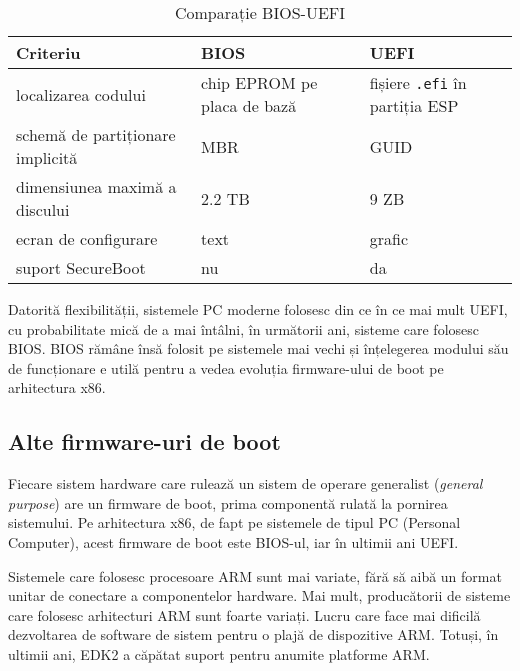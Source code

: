 \begin{table}[!htb]
  \caption{Comparație BIOS-UEFI}
  \begin{center}
    \begin{tabular}{ p{} p{} p{} }
      \toprule
        \textbf{Criteriu} &
        \textbf{BIOS} &
        \textbf{UEFI} \\
      \midrule
        localizarea codului &
        chip EPROM pe placa de bază &
        fișiere \texttt{.efi} în partiția ESP \\

        schemă de partiționare implicită &
        MBR &
        GUID \\

        dimensiunea maximă a discului &
        2.2 TB &
        9 ZB \\

        ecran de configurare &
        text &
        grafic \\

        suport SecureBoot &
        nu &
        da \\

      \bottomrule
    \end{tabular}
    \label{tab:boot:bios-uefi}
  \end{center}
\end{table}

Datorită flexibilității, sistemele PC  moderne
folosesc din ce în ce mai mult UEFI, cu probabilitate mică de a mai întâlni, în următorii ani,
sisteme care folosesc BIOS. BIOS rămâne însă folosit pe
sistemele mai vechi și înțelegerea modului său de funcționare e utilă pentru a
vedea evoluția firmware-ului de boot pe arhitectura x86.

\subsection{Alte firmware-uri de boot}
\label{sec:boot:other}

Fiecare sistem hardware care rulează un sistem de operare generalist (\textit{general
purpose}) are un firmware de boot, prima componentă rulată la pornirea
sistemului. Pe arhitectura x86, de fapt pe sistemele de tipul PC (Personal
Computer), acest firmware de boot este BIOS-ul, iar în ultimii ani UEFI.

Sistemele care folosesc procesoare ARM sunt mai variate, fără să aibă un format
unitar de conectare a componentelor hardware. Mai mult, producătorii de sisteme
care folosesc arhitecturi ARM sunt foarte variați. Lucru care face mai dificilă
dezvoltarea de software de sistem pentru o plajă de dispozitive ARM. Totuși,
în ultimii ani, EDK2 a căpătat suport pentru anumite platforme ARM.

